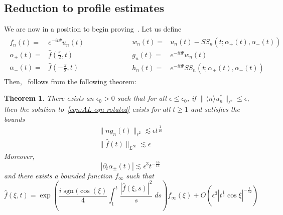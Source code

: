 \documentclass[letterpaper, reqno,final]{amsart}
\DeclareMathOperator{\sgn}{sgn}
\newcommand{\jBra}[1]{\langle #1 \rangle}
\newcommand{\fhPi}{\frac{\pi}{2}}
\newcommand{\mSS}{\mathit{SS}}
\newcommand{\discrAvg}{\Psi}
\newcommand{\invLinProp}[1][t]{e^{-i#1\discrAvg}}
\newcommand{\bigO}[1]{O\left({#1}\right)}
\newcommand{\stPhErr}{{\frac{1}{52}}}
\newtheorem{thm}{Theorem}
\begin{document}
\subsection{Reduction to profile estimates}
We are now in a position to begin proving~.  Let us define 
\begin{align*}
    \begin{aligned}
    f_n(t) =& \invLinProp u_n(t)\\
    \alpha_+(t) =& \hat{f}(\fhPi,t)\\
    \alpha_-(t) =& \hat{f}(-\fhPi,t)
    \end{aligned}\qquad\qquad\qquad
    \begin{aligned}
        w_n(t) =& u_n(t) - \mSS_n(t; \alpha_+(t), \alpha_-(t))\\
        g_n(t) =& \invLinProp  w_n(t)\\ 
        h_n(t) =& \invLinProp  \mSS_n(t; \alpha_+(t), \alpha_-(t))
        \end{aligned}
\end{align*}
Then,~ follows from the following theorem:
\begin{thm}\label{thm:prof-thm-A-L}
    There exists an $\epsilon_0 > 0$ such that for all $\epsilon \leq \epsilon_0$, if $\lVert \jBra{n} u^*_n \rVert_{\ell^2} \leq \epsilon$, then the solution to~\eqref{eqn:AL-eqn-rotated} exists for all $t \geq 1$ and satisfies the bounds
    \begin{align}
        \lVert n g_n(t) \rVert_{\ell^2} \lesssim \epsilon t^{\frac{1}{10}}\label{eqn:ngn-prof-est}\\ 
        \lVert \hat{f}(t) \rVert_{L^\infty} \lesssim \epsilon\label{eqn:f-hat-prof-est}
    \end{align}
    Moreover,
    \begin{equation}\label{eqn:alpha-pm-prof-est}
        |\partial_t \alpha_\pm(t)| \lesssim \epsilon^3 t^{-\frac{16}{15}}
    \end{equation}
    and there exists a bounded function $f_\infty$ such that
    \begin{equation}\label{eqn:f-hat-prof-asymp}
        \hat{f}(\xi,t) = \exp\left(\frac{i\sgn(\cos(\xi)}{4} \int_1^t \frac{|\hat{f}(\xi,s)|^2}{s}\;ds\right) f_\infty(\xi) + \bigO{\epsilon^3 |t^{\frac{1}{3}}\cos\xi|^{-\stPhErr}}
    \end{equation}
\end{thm}
\end{document}
